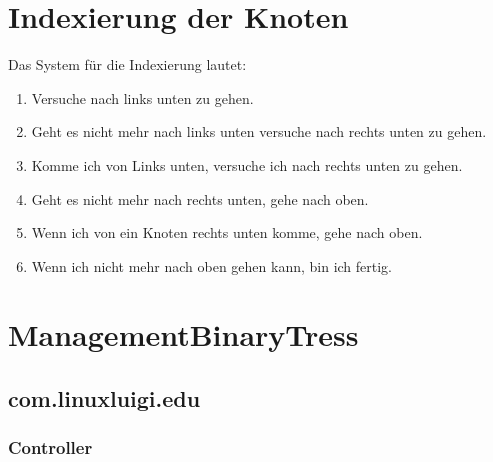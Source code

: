 \documentclass[letterpaper,10pt,ngerman]{sphinxmanual}
\begin{document}
\section{Indexierung der Knoten}
\label{\detokenize{aboutIndex::doc}}\label{\detokenize{aboutIndex:indexierung-der-knoten}}
Das System für die Indexierung lautet:
\begin{enumerate}
\item {} 
Versuche nach links unten zu gehen.

\item {} 
Geht es nicht mehr nach links unten versuche nach rechts unten zu gehen.

\item {} 
Komme ich von Links unten, versuche ich nach rechts unten zu gehen.

\item {} 
Geht es nicht mehr nach rechts unten, gehe nach oben.

\item {} 
Wenn ich von ein Knoten rechts unten komme, gehe nach oben.

\item {} 
Wenn ich nicht mehr nach oben gehen kann, bin ich fertig.

\end{enumerate}

\noindent{}


\section{ManagementBinaryTress}
\label{\detokenize{packages::doc}}\label{\detokenize{packages:managementbinarytress}}

\subsection{com.linuxluigi.edu}
\label{\detokenize{com/linuxluigi/edu/package-index:com-linuxluigi-edu}}\label{\detokenize{com/linuxluigi/edu/package-index::doc}}\label{\detokenize{com/linuxluigi/edu/package-index:package-com.linuxluigi.edu}}

\subsubsection{Controller}
\label{\detokenize{com/linuxluigi/edu/Controller::doc}}\label{\detokenize{com/linuxluigi/edu/Controller:controller}}
\end{document}
